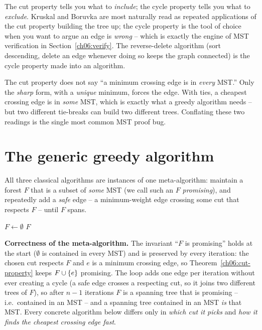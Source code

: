 \begin{intuitionbox}
The cut property tells you what to \emph{include}; the cycle property tells you what to \emph{exclude}. Kruskal and Boruvka are most naturally read as repeated applications of the cut property building the tree up; the cycle property is the tool of choice when you want to argue an edge is \emph{wrong} -- which is exactly the engine of MST verification in Section~\ref{ch06:verify}. The reverse-delete algorithm (sort descending, delete an edge whenever doing so keeps the graph connected) is the cycle property made into an algorithm.
\end{intuitionbox}

\begin{trapbox}
The cut property does not say ``a minimum crossing edge is in \emph{every} MST.'' Only the \emph{sharp} form, with a \emph{unique} minimum, forces the edge. With ties, a cheapest crossing edge is in \emph{some} MST, which is exactly what a greedy algorithm needs -- but two different tie-breaks can build two different trees. Conflating these two readings is the single most common MST proof bug.
\end{trapbox}

\section{The generic greedy algorithm}

All three classical algorithms are instances of one meta-algorithm: maintain a forest $F$ that is a subset of \emph{some} MST (we call such an $F$ \emph{promising}), and repeatedly add a \emph{safe} edge -- a minimum-weight edge crossing some cut that respects $F$ -- until $F$ spans.

\begin{algorithm}[H]
\caption{Generic-MST -- the greedy meta-algorithm}
\label{ch06:generic}
$F\gets\emptyset$\;
\Return $F$\;
\end{algorithm}

\begin{whybox}
\textbf{Correctness of the meta-algorithm.} The invariant ``$F$ is promising'' holds at the start ($\emptyset$ is contained in every MST) and is preserved by every iteration: the chosen cut respects $F$ and $e$ is a minimum crossing edge, so Theorem~\ref{ch06:cut-property} keeps $F\cup\{e\}$ promising. The loop adds one edge per iteration without ever creating a cycle (a safe edge crosses a respecting cut, so it joins two different trees of $F$), so after $n-1$ iterations $F$ is a spanning tree that is promising -- i.e.\ contained in an MST -- and a spanning tree contained in an MST \emph{is} that MST. Every concrete algorithm below differs only in \emph{which cut it picks} and \emph{how it finds the cheapest crossing edge fast}.
\end{whybox}

